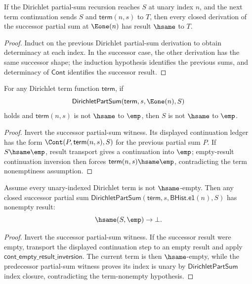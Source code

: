 \begin{lemma}
\label{lem:dirichlet-part-sum-successor-result-deterministic}
If the Dirichlet partial-sum recursion reaches $S$ at unary index $n$, and the
next term continuation sends $S$ and $\mathsf{term}(n,s)$ to $T$, then every
closed derivation of the successor partial sum at $\Eone(n)$ has result
$\hsame$ to $T$.
\end{lemma}
\begin{proof}
Induct on the previous Dirichlet partial-sum derivation to obtain determinacy at
each index. In the successor case, the other derivation has the same successor
shape; the induction hypothesis identifies the previous sums, and determinacy
of $\mathsf{Cont}$ identifies the successor result.
\end{proof}

\begin{lemma}
\label{thm:dirichlet-part-sum-successor-term-nonempty-result-nonempty}
For any Dirichlet term function $\mathsf{term}$, if
$$
\mathsf{DirichletPartSum}(\mathsf{term},s,\Eone(n),S)
$$
holds and $\mathsf{term}(n,s)$ is not $\hsame$ to $\emp$, then $S$ is not
$\hsame$ to $\emp$.
\end{lemma}
\begin{proof}
Invert the successor partial-sum witness. Its displayed continuation ledger has
the form $\Cont(P,\mathsf{term}(n,s),S)$ for the previous partial sum $P$. If
$S\hsame\emp$, result transport gives a continuation into $\emp$; empty-result
continuation inversion then forces $\mathsf{term}(n,s)\hsame\emp$,
contradicting the term nonemptiness assumption.
\end{proof}

\begin{theorem}
\label{thm:dirichlet-part-sum-successor-result-nonempty}
Assume every unary-indexed Dirichlet term is not \(\hsame\)-empty. Then any
closed successor partial sum
\(\mathsf{DirichletPartSum}(\mathsf{term},s,\mathsf{BHist.e1}(n),S)\)
has nonempty result:
$$
\hsame(S,\emp)\to\bot.
$$
\end{theorem}
\begin{proof}
Invert the successor partial-sum witness. If the successor result were empty,
transport the displayed continuation step to an empty result and apply
\(\mathsf{cont\_empty\_result\_inversion}\). The current term is then
\(\hsame\)-empty, while the predecessor partial-sum witness proves its index is
unary by \(\mathsf{DirichletPartSum}\) index closure, contradicting the
term-nonempty hypothesis.
\end{proof}

